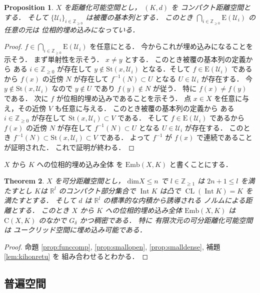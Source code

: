 \documentclass[leqno, a4paper, 12pt]{jsarticle}
\theoremstyle{plain}
\newtheorem{thm}{Theorem}[section]
\newtheorem{prop}[thm]{Proposition}
\theoremstyle{definition}
\theoremstyle{remark}
\newcommand{\zz}{\mathbb{Z}}
\newcommand{\rr}{\mathbb{R}}
\DeclareMathOperator{\cl}{\mathrm{CL}}
\DeclareMathOperator{\nai}{\mathrm{Int}}
\newcommand{\yodim}{\mathrm{dim}}
\newcommand{\yocovf}[1]{\mathscr{#1}}
\newcommand{\yostset}[1]{\mathrm{St}(#1)}
\newcommand{\yofuncsp}[2]{\mathrm{C}(#1, #2)}
\newcommand{\yofsusm}[1]{\mathrm{E}(#1)}
\newcommand{\yoemb}[2]{\mathrm{Emb}(#1, #2)}
\numberwithin{equation}{section}
\begin{document}
\begin{prop}\label{prop:umekomi}
$X$
を距離化可能空間とし，
$(K, d)$
を
コンパクト距離空間とする．
そして
$\{\yocovf{U}_{i}\}_{i\in \zz_{\ge0}}$
は被覆の基本列とする．
このとき
$\bigcap_{i\in \zz_{\ge 0}}\yofsusm{\yocovf{U}_{i}}$
の任意の元は
位相的埋め込みになっている．
\end{prop}
\begin{proof}
$f\in \bigcap_{i\in \zz_{\ge 0}}\yofsusm{\yocovf{U}_{i}}$
を任意にとる．
今からこれが埋め込みになることを示そう．
まず単射性を示そう．
$x\neq y$
とする．
このとき被覆の基本列の定義から
ある
$i\in \zz_{\ge 0}$
が存在して
$y\not \in \yostset{x, \yocovf{U}_{i}}$
となる．そして
$f\in \yofsusm{\yocovf{U}_{i}}$
であるから
$f(x)$
の近傍
$N$
が存在して
$f^{-1}(N)\subset U$
となる
$U\in \yocovf{U}_{i}$
が存在する．
今
$y\not \in \yostset{x, \yocovf{U}_{i}}$
なので 
$y\not \in U$
であり
$f(y)\not \in N$
が従う．
特に
$f(x)\neq f(y)$
である．
次に
$f$
が位相的埋め込みであることを示そう．
点
$x\in X$
を任意に与え，その近傍
$V$
も任意に与える．
このとき被覆の基本列の定義から
ある
$i\in \zz_{\ge 0}$
が存在して
$\yostset{x, \yocovf{U}_{i}}\subset V$
である．
そして
$f\in \yofsusm{\yocovf{U}_{i}}$
であるから
$f(x)$
の近傍
$N$
が存在して
$f^{-1}(N)\subset U$
となる
$U\in \yocovf{U}_{i}$
が存在する．
このとき
$f^{-1}(N)\subset \yostset{x, \yocovf{U}_{i}}\subset V$
である．
よって
$f^{-1}$
が
$f(x)$
で連続であることが証明された．
これで証明が終わる．
\end{proof}

$X$
から
$K$
への位相的埋め込み全体
を
$\yoemb{X}{K}$
と書くことにする．

\begin{thm}\label{thm:umekomidense}
$X$
を可分距離空間とし，
$\yodim X\le n$
で
$l\in \zz_{\ge 1}$
は
$2n+1\le l$
を満たすとし
$K$は
$\rr^{l}$
のコンパクト部分集合で
$\nai K$
は凸で
$\cl (\nai K)=K$
を満たすとする．
そして
$d$
は
$\rr^{l}$
の標準的な内積から誘導される
ノルムによる距離とする．
このとき
$X$
から
$K$
への位相的埋め込み全体
$\yoemb{X}{K}$
は
$\yofuncsp{X}{K}$
のなかで
$G_{\delta}$
かつ稠密である．
特に
有限次元の可分距離化可能空間は
ユークリッド空間に埋め込み可能である．
\end{thm}
\begin{proof}
命題
\ref{prop:funccomp}, 
\ref{prop:smallopen}, 
\ref{prop:smalldense}, 
補題
\ref{lem:kihonretu}
を
組み合わせるとわかる．
\end{proof}

\subsection{普遍空間}\label{subsec:universalsp}
\end{document}
